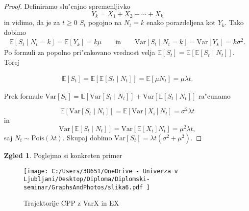 \documentclass[12pt, a4paper, reqno]{amsart}
\theoremstyle{definition}
\newtheorem{zgled}[definicija]{Zgled}
\theoremstyle{plain}
\newcommand{\E}{\mathbb{E}}
\newcommand{\1}{\mathds{1}}
\newcommand{\Pois}[1]{\text{Pois}(#1)}
\newcommand{\Var}[1]{\text{Var}\left[#1\right]}
\begin{document}
        \begin{proof}

            Definiramo slu"cajno spremenljivko
            \begin{equation}
                Y_k = X_1 + X_2 + \cdots + X_k
                \label{eq:Y_k}
            \end{equation}
            in vidimo, da je za $t\geq0$ $S_t$ pogojno na $N_t = k$ enako porazdeljena 
            kot $Y_k$. Tako dobimo 
            \begin{align*}
            \E\left[S_t\mid N_t = k\right] = \E\left[Y_k\right] = k\mu \qquad \text{in} \qquad
            \Var{S_t\mid N_t = k} = \Var{Y_k} = k\sigma^2.
            \end{align*}
            Po formuli za popolno pri"cakovano vrednost velja 
            $\E\left[S_t\right] = \E\left[\E\left[S_t\mid N_t\right]\right]$. Torej

            \begin{align*}
                \E\left[S_t\right] = \E\left[\E\left[S_t\mid N_t\right]\right] = \E\left[\mu N_t\right] = \mu\lambda t.
            \end{align*}

            \noindent
            Prek formule $\Var{S_t} = \E\left[\Var{S_t\mid N_t}\right] + \Var{\E\left[S_t\mid N_t\right]}$ ra"cunamo 

            \begin{equation*}
                \E\left[\Var{S_t\mid N_t}\right] = \E\left[\Var{X_i}N_t\right] = \sigma^2\lambda t
            \end{equation*}
            in 
            \begin{equation*}
                \Var{\E\left[S_t\mid N_t\right]} = \Var{\E\left[X_i\right]N_t} = \mu^2\lambda t,
            \end{equation*}
            saj $N_t\sim\Pois{\lambda t}$. Skupaj dobimo $\Var{S_t} = \lambda t\left(\sigma^2 + \mu^2\right)$.
        \end{proof}
    
    \begin{zgled}
        Poglejmo si konkreten primer

        \begin{figure}[H]
            \centering
            \texttt{[image: 
                C:/Users/38651/OneDrive - Univerza v Ljubljani/Desktop/Diploma/Diplomski-seminar/GraphsAndPhotos/slika6.pdf
                ]}
            \caption{Trajektorije CPP z VarX in EX}
            \label{fig:slika6}
        \end{figure}

    \end{zgled}
    
\end{document}
